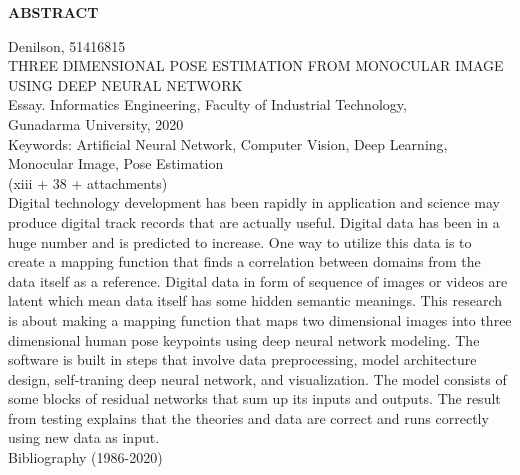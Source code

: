 \newpage %
\begin{center}
    \begin{large}\textbf{ABSTRACT}\end{large}
\end{center}

\vspace{5mm}

\noindent Denilson, 51416815 \\
THREE DIMENSIONAL POSE ESTIMATION FROM MONOCULAR IMAGE USING DEEP NEURAL NETWORK\\
Essay. Informatics Engineering, Faculty of Industrial Technology, \\
Gunadarma University, 2020\\
Keywords: Artificial Neural Network, Computer Vision, Deep Learning, Monocular Image, Pose Estimation\\
\noindent (xiii + 38 + attachments)\\

Digital technology development has been rapidly in application and science may produce digital track
records that are actually useful. Digital data has been in a huge number and is predicted to increase.
One way to utilize this data is to create a mapping function that finds a correlation between domains
from the data itself as a reference. Digital data in form of sequence of images or videos are latent
which mean data itself has some hidden semantic meanings. This research is about making a mapping
function that maps two dimensional images into three dimensional human pose keypoints using
deep neural network modeling. The software is built in steps that involve data preprocessing,
model architecture design, self-traning deep neural network, and visualization. The model consists of
some blocks of residual networks that sum up its inputs and outputs. The result from testing explains
that the theories and data are correct and runs correctly using new data as input.\\

\noindent Bibliography (1986-2020)